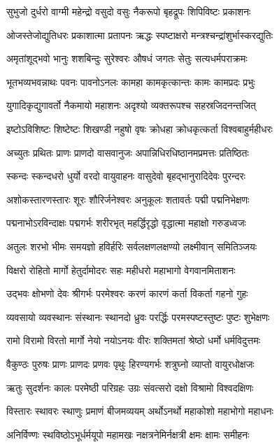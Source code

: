 \twolineshloka
{सुभुजो दुर्धरो वाग्मी महेन्द्रो वसुदो वसुः}
{नैकरूपो बृहद्रूपः शिपिविष्टः प्रकाशनः}

\twolineshloka
{ओजस्तेजोद्युतिधरः प्रकाशात्मा प्रतापनः}
{ऋद्धः स्पष्टाक्षरो मन्त्रश्चन्द्रांशुर्भास्करद्युतिः}

\twolineshloka
{अमृतांशूद्भवो भानुः शशबिन्दुः सुरेश्वरः}
{औषधं जगतः सेतुः सत्यधर्मपराक्रमः}

\twolineshloka
{भूतभव्यभवन्नाथः पवनः पावनोऽनलः}
{कामहा कामकृत्कान्तः कामः कामप्रदः प्रभुः}

\twolineshloka
{युगादिकृद्युगावर्तो नैकमायो महाशनः}
{अदृश्यो व्यक्तरूपश्च सहस्रजिदनन्तजित्}

\twolineshloka
{इष्टोऽविशिष्टः शिष्टेष्टः शिखण्डी नहुषो वृषः}
{क्रोधहा क्रोधकृत्कर्ता विश्वबाहुर्महीधरः}

\twolineshloka
{अच्युतः प्रथितः प्राणः प्राणदो वासवानुजः}
{अपान्निधिरधिष्ठानमप्रमत्तः प्रतिष्ठितः}

\twolineshloka
{स्कन्दः स्कन्दधरो धुर्यो वरदो वायुवाहनः}
{वासुदेवो बृहद्भानुरादिदेवः पुरन्दरः}

\twolineshloka
{अशोकस्तारणस्तारः शूरः शौरिर्जनेश्वरः}
{अनुकूलः शतावर्तः पद्मी पद्मनिभेक्षणः}

\twolineshloka
{पद्मनाभोऽरविन्दाक्षः पद्मगर्भः शरीरभृत्}
{महर्द्धिरृद्धो वृद्धात्मा महाक्षो गरुडध्वजः}

\twolineshloka
{अतुलः शरभो भीमः समयज्ञो हविर्हरिः}
{सर्वलक्षणलक्षण्यो लक्ष्मीवान् समितिञ्जयः}

\twolineshloka
{विक्षरो रोहितो मार्गो हेतुर्दामोदरः सहः}
{महीधरो महाभागो वेगवानमिताशनः}

\twolineshloka
{उद्भवः क्षोभणो देवः श्रीगर्भः परमेश्वरः}
{करणं कारणं कर्ता विकर्ता गहनो गुहः}

\twolineshloka
{व्यवसायो व्यवस्थानः संस्थानः स्थानदो ध्रुवः}
{परर्द्धिः परमस्पष्टस्तुष्टः पुष्टः शुभेक्षणः}

\twolineshloka
{रामो विरामो विरतो मार्गो नेयो नयोऽनयः}
{वीरः शक्तिमतां श्रेष्ठो धर्मो धर्मविदुत्तमः}

\twolineshloka
{वैकुण्ठः पुरुषः प्राणः प्राणदः प्रणवः पृथुः}
{हिरण्यगर्भः शत्रुघ्नो व्याप्तो वायुरधोक्षजः}

\twolineshloka
{ऋतुः सुदर्शनः कालः परमेष्ठी परिग्रहः}
{उग्रः संवत्सरो दक्षो विश्रामो विश्वदक्षिणः}

\twolineshloka
{विस्तारः स्थावरः स्थाणुः प्रमाणं बीजमव्ययम्}
{अर्थोऽनर्थो महाकोशो महाभोगो महाधनः}

\twolineshloka
{अनिर्विण्णः स्थविष्ठोऽभूर्धर्मयूपो महामखः}
{नक्षत्रनेमिर्नक्षत्री क्षमः क्षामः समीहनः}

